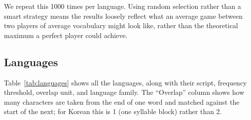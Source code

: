 We repeat this 1000 times per language.
Using random selection rather than a smart strategy means the results loosely reflect what an average game between two players of average vocabulary might look like, rather than the theoretical maximum a perfect player could achieve.

\subsection{Languages}

Table~\ref{tab:languages} shows all the languages, along with their script, frequency threshold, overlap unit, and language family.
The ``Overlap'' column shows how many characters are taken from the end of one word and matched against the start of the next; for Korean this is 1 (one syllable block) rather than 2.

